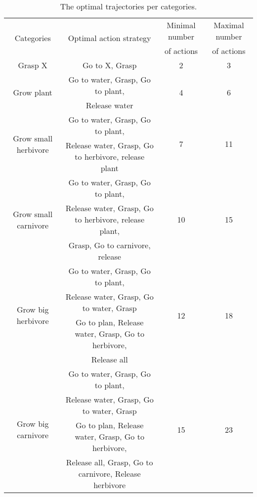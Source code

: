 \begin{table}[!ht]
\caption{The optimal trajectories per categories.}
\label{tab:optimal_trajectories_categories}
\begin{tabular}{|c|c|c|c|}
\hline
\multirow{2}{*}{Categories}           & \multirow{2}{*}{Optimal action strategy}              & Minimal number & Maximal number \\
                     &                                          & of actions     & of actions     \\ \hline
Grasp X              & Go to X, Grasp                           & 2              & 3              \\ \hline
\multirow{2}{*}{Grow plant} & Go to water, Grasp, Go to plant, & \multirow{2}{*}{4}              & \multirow{2}{*}{6}              \\
                     & Release water &              &             \\ \hline
\multirow{2}{*}{Grow small herbivore} & Go to water, Grasp, Go to plant, & \multirow{2}{*}{7}              & \multirow{2}{*}{11}              \\
                     & Release water, Grasp, Go to herbivore, release plant &              &             \\ \hline
\multirow{3}{*}{Grow small carnivore} & Go to water, Grasp, Go to plant, & \multirow{3}{*}{10}              & \multirow{3}{*}{15}              \\
                     & Release water, Grasp, Go to herbivore, release plant, &              &             \\
                     & Grasp, Go to carnivore, release &              &             \\ \hline
\multirow{4}{*}{Grow big herbivore} & Go to water, Grasp, Go to plant, & \multirow{4}{*}{12}              & \multirow{4}{*}{18}              \\
                     & Release water, Grasp, Go to water, Grasp &              &             \\ 
                     & Go to plan, Release water, Grasp, Go to herbivore, &              &             \\ 
                     & Release all &              &             \\ \hline
\multirow{4}{*}{Grow big carnivore} & Go to water, Grasp, Go to plant, & \multirow{4}{*}{15}              & \multirow{4}{*}{23}              \\
                     & Release water, Grasp, Go to water, Grasp &              &             \\ 
                     & Go to plan, Release water, Grasp, Go to herbivore, &              &             \\ 
                     & Release all, Grasp, Go to carnivore, Release herbivore &              &             \\ \hline
\end{tabular}
\end{table}